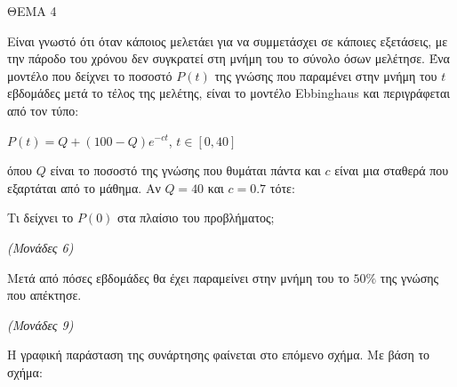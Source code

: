 \documentclass[11pt,a4paper,twoside]{book}
\newcommand{\monades}[1]{\hfill \textit{(Μονάδες #1)}}
\begin{document}
\vspace{4mm}

ΘΕΜΑ 4

Είναι γνωστό ότι όταν κάποιος μελετάει για να συμμετάσχει σε κάποιες εξετάσεις, με την πάροδο του χρόνου δεν συγκρατεί στη μνήμη του το σύνολο όσων μελέτησε. Ένα μοντέλο που δείχνει το ποσοστό $P(t)$ της γνώσης που παραμένει στην μνήμη του $t$ εβδομάδες μετά το τέλος της μελέτης, είναι το μοντέλο Ebbinghaus και περιγράφεται από τον τύπο:

$P(t) = Q + (100 - Q)e^{-ct}$, $t \in [0, 40]$

όπου $Q$ είναι το ποσοστό της γνώσης που θυμάται πάντα και $c$ είναι μια σταθερά που εξαρτάται από το μάθημα. Αν $Q = 40$ και $c = 0.7$ τότε:

\begin{alist}
\item Τι δείχνει το $P(0)$ στα πλαίσιο του προβλήματος;

\monades{6}

\item Μετά από πόσες εβδομάδες θα έχει παραμείνει στην μνήμη του το $50\%$ της γνώσης που απέκτησε.

\monades{9}


\begin{center}


\end{center}
Η γραφική παράσταση της συνάρτησης φαίνεται στο επόμενο σχήμα. Με βάση το σχήμα:


\end{alist}
\end{document}
